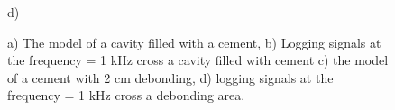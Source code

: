 \documentclass[10pt,twoside]{article}
\begin{document}
\begin{figure}[ht!]
\begin{minipage}[h]{0.26\linewidth}
 d) \\
\end{minipage}
\caption{a) The model of a cavity filled with a cement, b) Logging signals at the frequency = 1 kHz cross a cavity filled with cement c) the model of a cement with 2 cm debonding, d) logging signals at the frequency = 1 kHz cross a debonding area.}
\label{cavityanddebond}
\end{figure}
\end{document}
